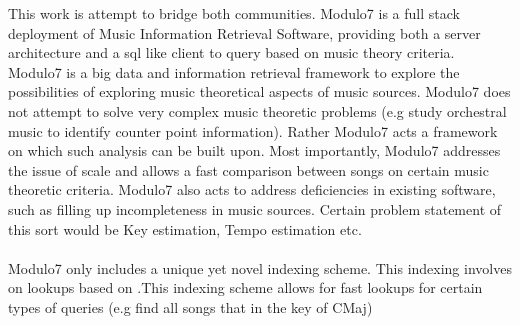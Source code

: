 This work is attempt to bridge both communities. Modulo7 is a full stack deployment of Music Information Retrieval Software, providing both a server architecture and a sql like client to query based on music theory criteria. Modulo7 is a big data and information retrieval framework to explore the possibilities of exploring music theoretical aspects of music sources. Modulo7 does not attempt to solve very complex music theoretic problems (e.g study orchestral music to identify counter point information). Rather Modulo7 acts a framework on which such analysis can be built upon. Most importantly, Modulo7 addresses the issue of scale and allows a fast comparison between songs on certain music theoretic criteria. Modulo7 also acts to address deficiencies in existing software, such as filling up incompleteness in music sources. Certain problem statement of this sort would be Key estimation, Tempo estimation etc. \\\\
Modulo7 only includes a unique yet novel indexing scheme. This indexing involves on lookups based on  .This indexing scheme allows for fast lookups for certain types of queries (e.g find all songs that in the key of CMaj)